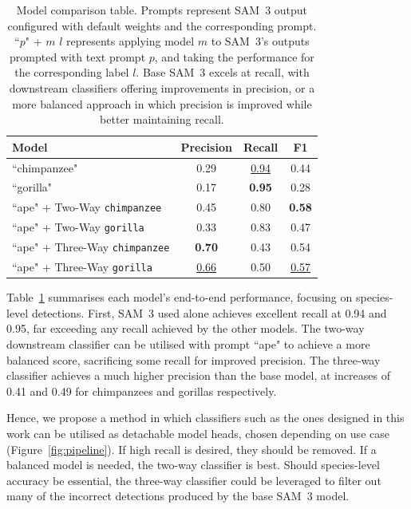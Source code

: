 \documentclass[author={Jacob Stephenson},
    degree={BSc},
    title={Robust Great Ape Species Detection in Wild Camera Trap Imagery with Promptable Concept Segmentation},
    unit={COMS30045},
    subtitle={}]{dissertation}
\begin{document}
\begin{table}[H]
    \centering

    \begin{tabular}{l|ccc}
        \toprule
        \textbf{Model} & \textbf{Precision} & \textbf{Recall} & \textbf{F1} \\
        \midrule
        ``chimpanzee" & 0.29 & \underline{0.94} & 0.44 \\
        ``gorilla" & 0.17 & \textbf{0.95} & 0.28 \\
        \midrule
        ``ape" + Two-Way \texttt{chimpanzee} & 0.45 & 0.80 & \textbf{0.58} \\
        ``ape" + Two-Way \texttt{gorilla} & 0.33 & 0.83 & 0.47 \\
        \midrule
        ``ape" + Three-Way \texttt{chimpanzee} & \textbf{0.70} & 0.43 & 0.54 \\
        ``ape" + Three-Way \texttt{gorilla} & \underline{0.66} & 0.50 & \underline{0.57} \\
        \bottomrule        
    \end{tabular}

    \caption[Model Comparison]{Model comparison table. Prompts represent SAM~3 output configured with default weights and the corresponding prompt. ``$p$" + $m$ $l$ represents applying model $m$ to SAM~3's outputs prompted with text prompt $p$, and taking the performance for the corresponding label $l$. Base SAM~3 excels at recall, with downstream classifiers offering improvements in precision, or a more balanced approach in which precision is improved while better maintaining recall.}
    \label{tab:modelcomp}
\end{table}

Table~\ref{tab:modelcomp} summarises each model's end-to-end performance, focusing on species-level detections. First, SAM~3 used alone achieves excellent recall at 0.94 and 0.95, far exceeding any recall achieved by the other models. The two-way downstream classifier can be utilised with prompt ``ape" to achieve a more balanced score, sacrificing some recall for improved precision. The three-way classifier achieves a much higher precision than the base model, at increases of 0.41 and 0.49 for chimpanzees and gorillas respectively.

Hence, we propose a method in which classifiers such as the ones designed in this work can be utilised as detachable model heads, chosen depending on use case (Figure~\ref{fig:pipeline}). If high recall is desired, they should be removed. If a balanced model is needed, the two-way classifier is best. Should species-level accuracy be essential, the three-way classifier could be leveraged to filter out many of the incorrect detections produced by the base SAM~3 model.
\end{document}
